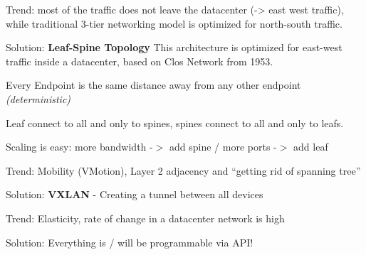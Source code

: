 \vspace{3mm}
\noindent
Trend: most of the traffic does not leave the datacenter (-> east west traffic), while traditional 3-tier networking model is optimized for north-south traffic.

\noindent
Solution: \textbf{Leaf-Spine Topology}
This architecture is optimized for east-west traffic inside a datacenter, based on Clos Network from 1953.

Every Endpoint is the same distance away from any other endpoint \emph{(deterministic)}

Leaf connect to all and only to spines, spines connect to all and only to leafs.

Scaling is easy: more bandwidth -$>$ add spine / more ports -$>$ add leaf

\vspace{3mm}
\noindent
Trend: Mobility (VMotion), Layer 2 adjacency and ``getting rid of spanning tree''

\noindent
Solution: \textbf{VXLAN} - Creating a tunnel between all devices

\vspace{3mm}
\noindent
Trend: Elasticity, rate of change in a datacenter network is high

\noindent
Solution: Everything is / will be programmable via API!
